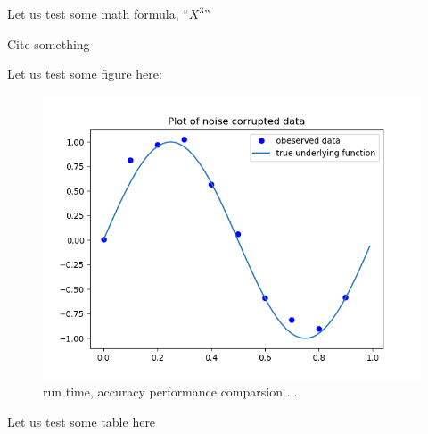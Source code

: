 \documentclass{amsart}
\theoremstyle{definition}
\theoremstyle{remark}
\numberwithin{equation}{section}
\begin{document}
Let us test some math formula, ``$X^{3}$''

Cite something \cite{domingos2012few}

Let us test some figure here:

\begin{figure}[!ht]
  \includegraphics[width=\linewidth]{fig/figure_3.png}
  \caption{run time, accuracy performance comparsion ...}
  \label{fig:cf_vs_gd}
\end{figure}


Let us test some table here
\end{document}
